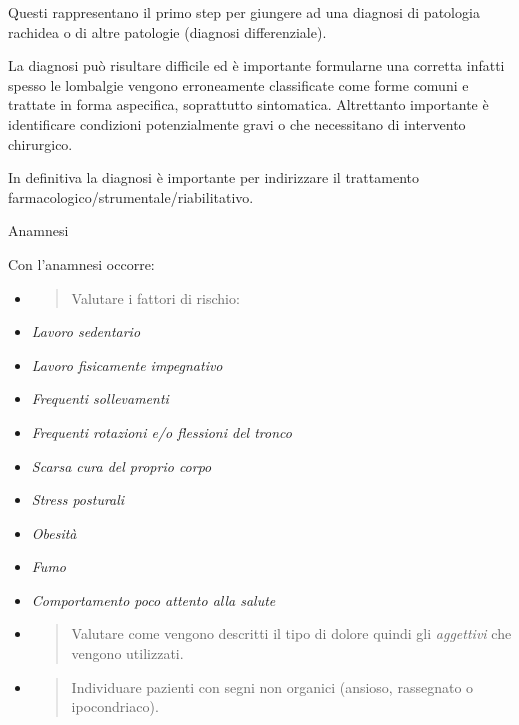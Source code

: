 \documentclass[]{article}
\begin{document}
Questi rappresentano il primo step per giungere ad una diagnosi di
patologia rachidea o di altre patologie (diagnosi differenziale).

La diagnosi può risultare difficile ed è importante formularne una
corretta infatti spesso le lombalgie vengono erroneamente classificate
come forme comuni e trattate in forma aspecifica, soprattutto
sintomatica. Altrettanto importante è identificare condizioni
potenzialmente gravi o che necessitano di intervento chirurgico.

In definitiva la diagnosi è importante per indirizzare il trattamento
farmacologico/strumentale/riabilitativo.

Anamnesi

Con l'anamnesi occorre:

\begin{itemize}
\item
  \begin{quote}
  Valutare i fattori di rischio:
  \end{quote}
\end{itemize}

\begin{itemize}
\item
  \emph{Lavoro sedentario}
\item
  \emph{Lavoro fisicamente impegnativo}
\item
  \emph{Frequenti sollevamenti}
\item
  \emph{Frequenti rotazioni e/o flessioni del tronco}
\item
  \emph{Scarsa cura del proprio corpo}
\item
  \emph{Stress posturali}
\item
  \emph{Obesità}
\item
  \emph{Fumo}
\item
  \emph{Comportamento poco attento alla salute}
\end{itemize}

\begin{itemize}
\item
  \begin{quote}
  Valutare come vengono descritti il tipo di dolore quindi gli
  \emph{aggettivi} che vengono utilizzati.
  \end{quote}
\end{itemize}

\begin{itemize}
\item
  \begin{quote}
  Individuare pazienti con segni non organici (ansioso, rassegnato o
  ipocondriaco).
  \end{quote}
\end{itemize}
\end{document}
